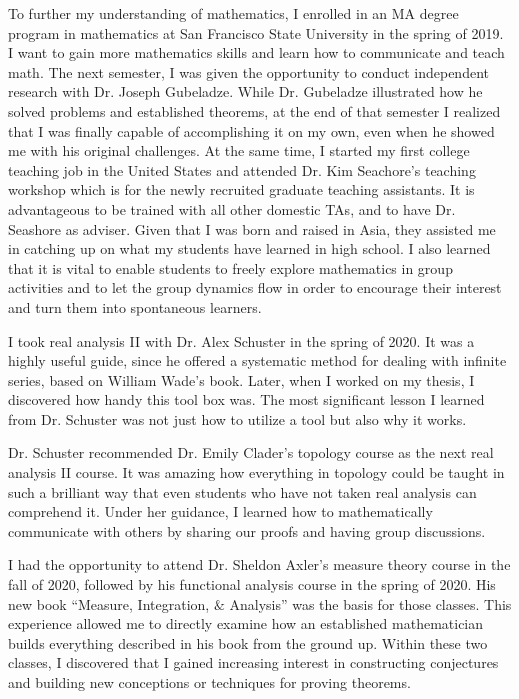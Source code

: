 \documentclass[10pt]{amsart}
\begin{document}
To further my understanding of mathematics, I enrolled in an MA degree program in mathematics at San Francisco State University in the spring of 2019. I want to gain more mathematics skills and learn how to communicate and teach math. The next semester, I was given the opportunity to conduct independent research with Dr. Joseph Gubeladze. While Dr. Gubeladze illustrated how he solved problems and established theorems, at the end of that semester I realized that I was finally capable of accomplishing it on my own, even when he showed me with his original challenges. At the same time, I started my first college teaching job in the United States and attended Dr. Kim Seachore's teaching workshop which is for the newly recruited graduate teaching assistants. It is advantageous to be trained with all other domestic TAs, and to have Dr. Seashore as adviser. Given that I was born and raised in Asia, they assisted me in catching up on what my students have learned in high school. I also learned that it is vital to enable students to freely explore mathematics in group activities and to let the group dynamics flow in order to encourage their interest and turn them into spontaneous learners.


I took real analysis II with Dr. Alex Schuster in the spring of 2020. It was a highly useful guide, since he offered a systematic method for dealing with infinite series, based on William Wade's book. Later, when I worked on my thesis, I discovered how handy this tool box was. The most significant lesson I learned from Dr. Schuster was not just how to utilize a tool but also why it works.

Dr. Schuster recommended Dr. Emily Clader's topology course as the next real analysis II course. It was amazing how everything in topology could be taught in such a brilliant way that even students who have not taken real analysis can comprehend it. Under her guidance, I learned how to mathematically communicate with others by sharing our proofs and having group discussions. 

I had the opportunity to attend Dr. Sheldon Axler's measure theory course in the fall of 2020,
followed by his functional analysis course in the spring of 2020. His new book ``Measure, Integration, $\&$ Analysis'' was the basis for those classes. This experience allowed me to directly examine how an established mathematician builds everything described in his book from the ground up. Within these two classes, I discovered that I gained increasing interest in constructing conjectures and building new conceptions or techniques for proving theorems.
\end{document}

